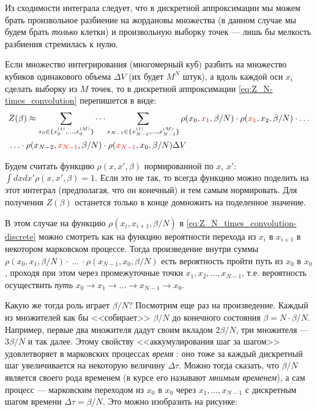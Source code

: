 \begin{lecture}
Из сходимости интеграла следует, что в дискретной аппроксимации мы можем брать произвольное разбиение на жордановы множества (в данном случае мы будем брать \textit{только} клетки) и произвольную выборку точек --- лишь бы мелкость разбиения стремилась к нулю.

Если множество интегрирования (многомерный куб) разбить на множество кубиков одинакового объема $\Delta V$ (их будет $M^N$ штук), а вдоль каждой оси $x_i$ сделать выборку из $M$ точек, то в дискретной аппроксимации \eqref{eq:Z_N-times_convolution} перепишется в виде:
\begin{align}
    \label{eq:Z_N_times_convolution-discrete}
    & Z (\beta) \approx \sum\limits_{x_0 \in \{x_0^{(1)}, \dots, x_0^{(M)}\}} \dots \sum\limits_{x_{N-1} \in \{x_{N-1}^{(1)}, \dots, x_{N-1}^{(M)}\}}
    \rho (x_0, {\color{red} x_1}, \beta / N) \cdot \rho ({\color{red} x_1}, x_2, \beta / N) \cdot \dots \\
    & \ldots \cdot \rho (x_{N-2}, {\color{red} x_{N-1}}, \beta / N) \cdot \rho ({\color{red} x_{N-1}}, x_0, \beta / N) \Delta V
\end{align}

Будем считать функцию $\rho (x, x', \beta)$ нормированной по $x$, $x'$: $\int dx dx' \rho (x, x', \beta) = 1$.
Если это не так, то всегда функцию можно поделить на этот интеграл (предполагая, что он конечный) и тем самым нормировать.
Для получения $Z(\beta)$ останется только в конце домножить на поделенное значение.

В этом случае на функцию $\rho (x_i, x_{i+1}, \beta / N)$ в \eqref{eq:Z_N_times_convolution-discrete} можно смотреть как на функцию вероятности перехода из $x_i$ в $x_{i+1}$ в некотором марковском процессе. 
Тогда произведение внутри суммы $\rho (x_0, x_1, \beta /N)\cdot~\dots~\cdot\rho(x_{N-1}, x_0, \beta /N)$ есть вероятность пройти путь из $x_0$ в $x_0$, проходя при этом через промежуточные точки $x_1, x_2, \dots, x_{N-1} $, т.е. вероятность осуществить \textit{путь} $x_0 \rightarrow x_1 \rightarrow \dots \rightarrow x_{N-1} \rightarrow x_0$. 


Какую же тогда роль играет $\beta /N$?
Посмотрим еще раз на произведение. Каждый из множителей как бы <<собирает>> $\beta /N$ до конечного состояния $\beta = N \cdot \beta /N$.
Например, первые два множителя дадут своим вкладом $2\beta /N$, три множителя --- $3\beta /N$ и так далее.
Этому свойству <<аккумулирования шаг за шагом>> удовлетворяет в марковских процессах \textit{время} : оно тоже за каждый дискретный шаг увеличивается на некоторую величину $\Delta \tau$.
Можно тогда сказать, что $\beta /N$ является своего рода временем (в курсе его называют \textit{мнимым временем}), а сам процесс --- марковским переходом из $x_0$ в $x_0$ через $x_1, \dots, x_{N-1} $ с дискретным шагом времени $\Delta \tau = \beta /N$.
Это можно изобразить на рисунке:
\end{lecture}
